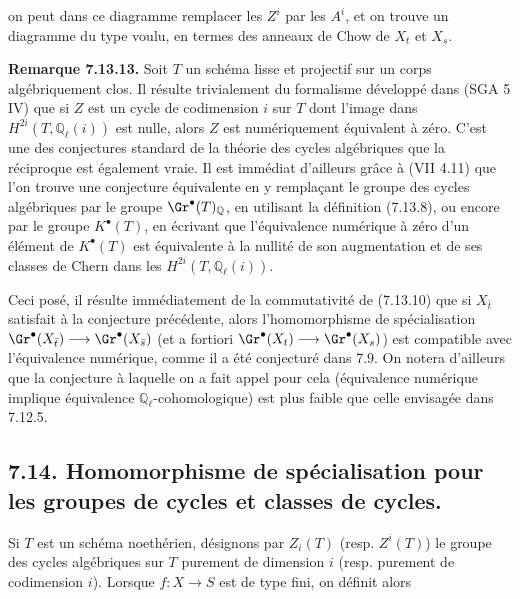 
on peut dans ce diagramme remplacer les \(Z^i\) par les \(A^i\), et on trouve un diagramme du type voulu, en termes des anneaux de Chow de \(X_t\) et \(X_s\).

\textbf{Remarque 7.13.13.} Soit \(T\) un schéma lisse et projectif sur un corps algébriquement clos. Il résulte trivialement du formalisme développé dans (SGA 5 IV) que si \(Z\) est un cycle de codimension \(i\) sur \(T\) dont l'image dans \(H^{2i}(T,\mathbb Q_\ell(i))\) est nulle, alors \(Z\) est numériquement équivalent à zéro. C'est une des conjectures standard de la théorie des cycles algébriques que la réciproque est également vraie. Il est immédiat d'ailleurs grâce à (VII 4.11) que l'on trouve une conjecture équivalente en y remplaçant le groupe des cycles algébriques par le groupe \(\Gr^\bullet(T)_{\mathbb Q}\), en utilisant la définition (7.13.8), ou encore par le groupe \(K^\bullet(T)\), en écrivant que l'équivalence numérique à zéro d'un élément de \(K^\bullet(T)\) est équivalente à la nullité de son augmentation et de ses classes de Chern dans les \(H^{2i}(T,\mathbb Q_\ell(i))\).

Ceci posé, il résulte immédiatement de la commutativité de (7.13.10) que si \(X_{\bar t}\) satisfait à la conjecture précédente, alors l'homomorphisme de spécialisation \(\Gr^\bullet(X_{\bar t})\longrightarrow \Gr^\bullet(X_{\bar s})\) (et a fortiori \(\Gr^\bullet(X_t)\longrightarrow \Gr^\bullet(X_s)\)) est compatible avec l'équivalence numérique, comme il a été conjecturé dans 7.9. On notera d'ailleurs que la conjecture à laquelle on a fait appel pour cela (équivalence numérique implique équivalence \(\mathbb Q_\ell\)-cohomologique) est plus faible que celle envisagée dans 7.12.5.

\subsection*{7.14. Homomorphisme de spécialisation pour les groupes de cycles et classes de cycles.}
Si \(T\) est un schéma noethérien, désignons par \(Z_i(T)\) (resp. \(Z^i(T)\)) le groupe des cycles algébriques sur \(T\) purement de dimension \(i\) (resp. purement de codimension \(i\)). Lorsque \(f:X\to S\) est de type fini, on définit alors
